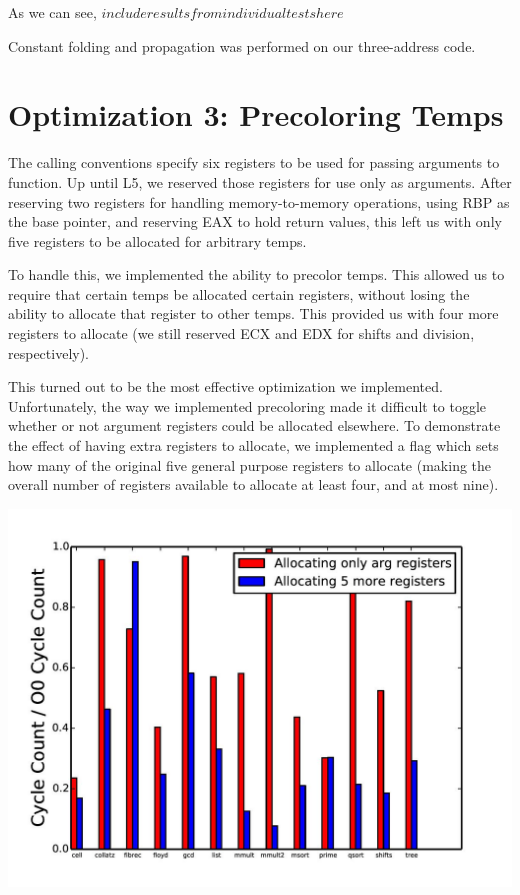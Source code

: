 \documentclass{article}
\begin{document}
As we can see, $include results from individual tests here$

Constant folding and propagation was performed on our three-address code.

\section{Optimization 3: Precoloring Temps}

The calling conventions specify six registers to be used for passing arguments to function. Up until L5, we reserved those registers for use only as arguments. After reserving two registers for handling memory-to-memory operations, using RBP as the base pointer, and reserving EAX to hold return values, this left us with only five registers to be allocated for arbitrary temps.

To handle this, we implemented the ability to precolor temps. This allowed us to require that certain temps be allocated certain registers, without losing the ability to allocate that register to other temps. This provided us with four more registers to allocate (we still reserved ECX and EDX for shifts and division, respectively). 

This turned out to be the most effective optimization we implemented. Unfortunately, the way we implemented precoloring made it difficult to toggle whether or not argument registers could be allocated elsewhere. To demonstrate the effect of having extra registers to allocate, we implemented a flag which sets how many of the original five general purpose registers to allocate (making the overall number of registers available to allocate at least four, and at most nine).

\includegraphics[scale=0.5]{allocating_more_regs-page-001}
\end{document}

